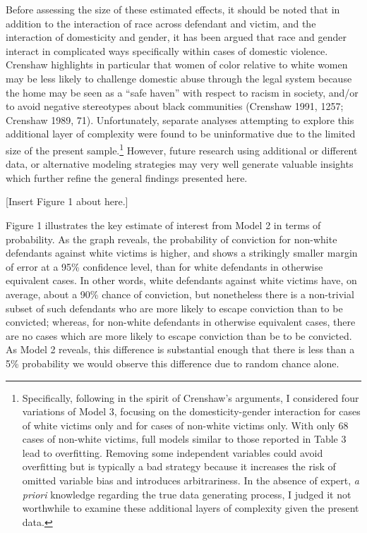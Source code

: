 \documentclass[12pt,article]{article}
\begin{document}
Before assessing the size of these estimated effects, it should be noted
that in addition to the interaction of race across defendant and victim,
and the interaction of domesticity and gender, it has been argued that
race and gender interact in complicated ways specifically within cases
of domestic violence. Crenshaw highlights in particular that women of
color relative to white women may be less likely to challenge domestic
abuse through the legal system because the home may be seen as a ``safe
haven'' with respect to racism in society, and/or to avoid negative
stereotypes about black communities (Crenshaw 1991, 1257; Crenshaw 1989,
71). Unfortunately, separate analyses attempting to explore this
additional layer of complexity were found to be uninformative due to the
limited size of the present sample.\footnote{Specifically, following in
  the spirit of Crenshaw's arguments, I considered four variations of
  Model 3, focusing on the domesticity-gender interaction for cases of
  white victims only and for cases of non-white victims only. With only
  68 cases of non-white victims, full models similar to those reported
  in Table 3 lead to overfitting. Removing some independent variables
  could avoid overfitting but is typically a bad strategy because it
  increases the risk of omitted variable bias and introduces
  arbitrariness. In the absence of expert, \emph{a priori} knowledge
  regarding the true data generating process, I judged it not worthwhile
  to examine these additional layers of complexity given the present
  data.} However, future research using additional or different data, or
alternative modeling strategies may very well generate valuable insights
which further refine the general findings presented here.


\begin{center}[Insert Figure 1 about here.]\end{center}

Figure 1 illustrates the key estimate of interest from Model 2 in terms
of probability. As the graph reveals, the probability of conviction for
non-white defendants against white victims is higher, and shows
a strikingly smaller margin of error at a 95\% confidence level, than 
for white defendants in otherwise equivalent cases. In
other words, white defendants against white victims have, on average,
about a 90\% chance of conviction, but nonetheless there is a
non-trivial subset of such defendants who are more likely to escape
conviction than to be convicted; whereas, for non-white defendants in otherwise equivalent
cases, there are no cases which are more likely to escape conviction than be to be convicted. As
Model 2 reveals, this difference is substantial enough that there is
less than a 5\% probability we would observe this difference due to
random chance alone.
\end{document}
